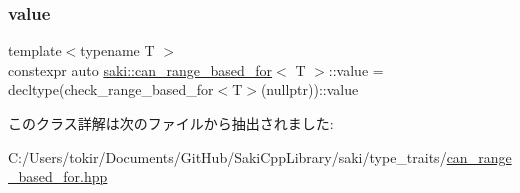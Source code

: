 \subsubsection{\texorpdfstring{value}{value}}
{\footnotesize\ttfamily template$<$typename T $>$ \\
constexpr auto \mbox{\hyperlink{classsaki_1_1can__range__based__for}{saki\+::can\+\_\+range\+\_\+based\+\_\+for}}$<$ T $>$\+::value = decltype(check\+\_\+range\+\_\+based\+\_\+for$<$T$>$(nullptr))\+::value\hspace{0.3cm}{\ttfamily [static]}}



このクラス詳解は次のファイルから抽出されました\+:\begin{DoxyCompactItemize}
\item 
C\+:/\+Users/tokir/\+Documents/\+Git\+Hub/\+Saki\+Cpp\+Library/saki/type\+\_\+traits/\mbox{\hyperlink{can__range__based__for_8hpp}{can\+\_\+range\+\_\+based\+\_\+for.\+hpp}}\end{DoxyCompactItemize}
